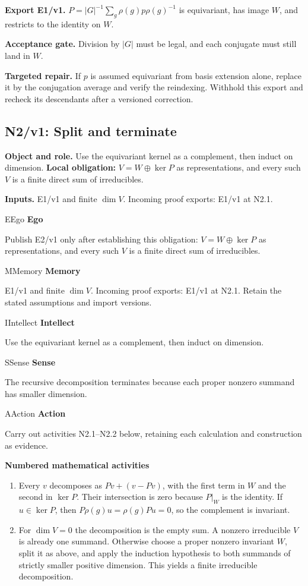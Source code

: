 \documentclass[preprint,12pt,aps,pra,showkeys,amsmath,amssymb,superscriptaddress,floatfix]{revtex4-2}
\theoremstyle{definition}
\theoremstyle{remark}
\newcommand{\mmfaculty}[3]{%
 \begin{mmfacultybox}{#1}{#2}
 {\sffamily\bfseries\color{MMBlue}#2}\par\smallskip #3
 \end{mmfacultybox}}
\newcommand{\field}[2]{\par\smallskip\noindent\textbf{#1.} #2\par}
\begin{document}
\field{Export E1/v1}{\(P=|G|^{-1}\sum_g\rho(g)p\rho(g)^{-1}\) is equivariant, has image
\(W\), and restricts to the identity on \(W\).}

\field{Acceptance gate}{Division by \(|G|\) must be legal, and each conjugate must still land in
\(W\).}

\field{Targeted repair}{If \(p\) is assumed equivariant from basis extension alone, replace it
by the conjugation average and verify the reindexing. Withhold this
export and recheck its descendants after a versioned correction.}

\clearpage

\subsection{N2/v1: Split and terminate}

\field{Object and role}{Use the equivariant kernel as a complement, then induct on dimension.
\textbf{Local obligation:} \(V=W\oplus\ker P\) as representations, and
every such \(V\) is a finite direct sum of irreducibles.}

\field{Inputs}{E1/v1 and finite \(\dim V\). Incoming proof exports: E1/v1 at N2.1.}

\mmfaculty{E}{Ego}{Publish E2/v1 only after establishing this obligation:
\(V=W\oplus\ker P\) as representations, and every such \(V\) is a finite
direct sum of irreducibles.}

\mmfaculty{M}{Memory}{E1/v1 and finite \(\dim V\). Incoming proof exports: E1/v1 at N2.1.
Retain the stated assumptions and import versions.}

\mmfaculty{I}{Intellect}{Use the equivariant kernel as a complement, then induct on dimension.}

\mmfaculty{S}{Sense}{The recursive decomposition terminates because each proper nonzero
summand has smaller dimension.}

\mmfaculty{A}{Action}{Carry out activities N2.1--N2.2 below, retaining each calculation and
construction as evidence.}

\smallskip\noindent\textbf{Numbered mathematical activities}

\begin{enumerate}[label=N2.\arabic*,leftmargin=3.4em]

\item Every \(v\) decomposes as \(Pv+(v-Pv)\), with the first term in \(W\)
and the second in \(\ker P\). Their intersection is zero because
\(P|_W\) is the identity. If \(u\in\ker P\), then
\(P\rho(g)u=\rho(g)Pu=0\), so the complement is invariant.

\item For \(\dim V=0\) the decomposition is the empty sum. A nonzero
irreducible \(V\) is already one summand. Otherwise choose a proper
nonzero invariant \(W\), split it as above, and apply the induction
hypothesis to both summands of strictly smaller positive dimension. This
yields a finite irreducible decomposition.

\end{enumerate}
\end{document}
